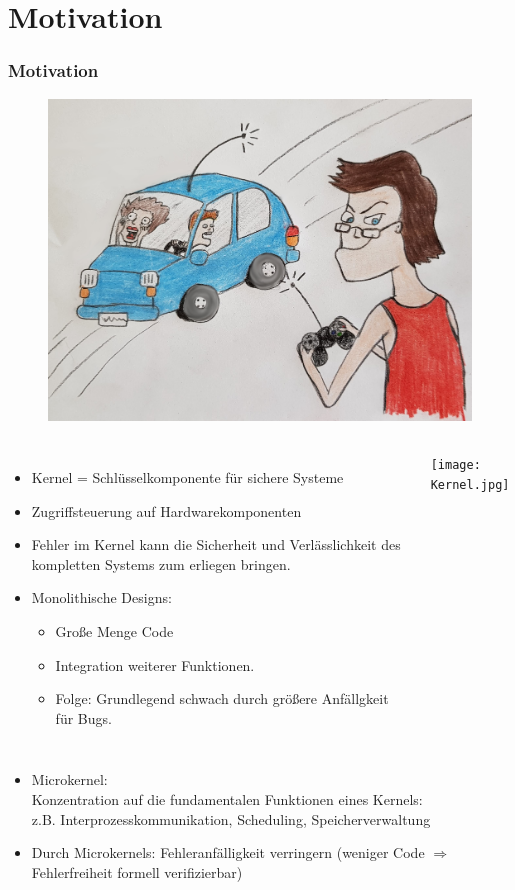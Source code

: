 \documentclass{beamer}
\begin{document}
\section{Motivation}
\begin{frame}
\frametitle{Motivation}
\begin{figure}[t]
\includegraphics[width=1\linewidth]{Auto.jpg}
\end{figure}
\end{frame}


\begin{frame}
\begin{columns}[c]
\begin{itemize}
\item Kernel = Schlüsselkomponente für sichere Systeme
\item Zugriffsteuerung auf Hardwarekomponenten
\item Fehler im Kernel kann die Sicherheit und Verlässlichkeit des kompletten Systems zum erliegen bringen.
\item Monolithische Designs: 
\begin{itemize}
\item Große Menge Code
\item Integration weiterer Funktionen.
\item Folge: Grundlegend schwach durch größere Anfällgkeit für Bugs.
\end{itemize}
\end{itemize}
\texttt{[image: Kernel.jpg]}
\end{columns}
\begin{itemize}
\item Microkernel:\\
Konzentration auf die fundamentalen Funktionen eines Kernels: \\
z.B. Interprozesskommunikation, Scheduling, Speicherverwaltung
\item Durch Microkernels: Fehleranfälligkeit verringern (weniger Code $\Rightarrow$ Fehlerfreiheit formell verifizierbar)
\end{itemize}
\end{frame}
\end{document}
